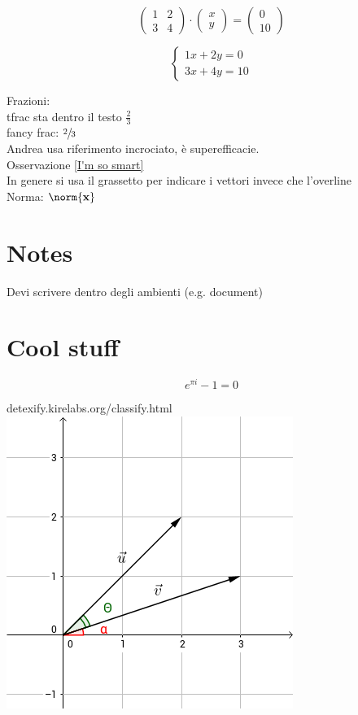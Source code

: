 \documentclass[10pt,a4paper]{article}
\theoremstyle{plain}
\theoremstyle{definition}
\begin{document}
$$
\begin{pmatrix}
	1 & 2 \\
	3 & 4
\end{pmatrix}
\cdot
\begin{pmatrix}
	x \\
	y
\end{pmatrix}
=
\begin{pmatrix}
	0 \\
	10
\end{pmatrix}
$$

$$
\begin{cases}
	1x+2y=0 \\
	3x+4y=10
\end{cases}
$$

Frazioni: \\
tfrac sta dentro il testo $\tfrac{2}{3}$ \\
fancy frac: $\sfrac{2}{3}$ \\


Andrea usa riferimento incrociato, è superefficacie.\\
Osservazione \ref{I'm so smart}\\

In genere si usa il grassetto per indicare i vettori invece che l'overline\\
Norma: $\norm{\mathbf{x}}$
\section{Notes}
Devi scrivere dentro degli ambienti (e.g. document)

\section{Cool stuff}
$$
e^{\pi i} - 1 = 0
$$

detexify.kirelabs.org/classify.html \\

\includegraphics[scale=0.5]{graph.png}
\end{document}
